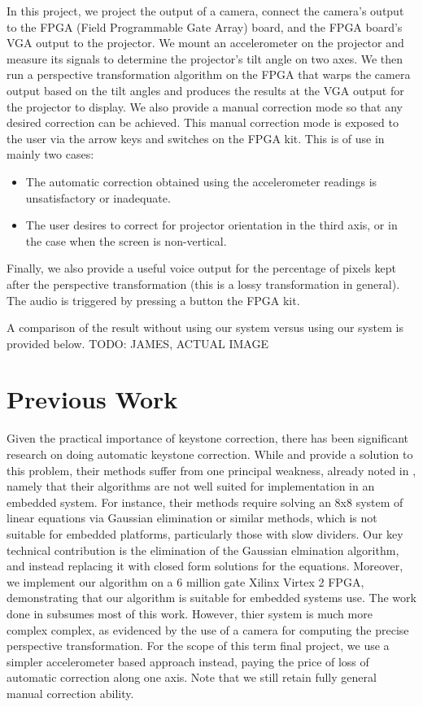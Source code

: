 \documentclass{article}
\begin{document}
In this project, we project the output of a camera, connect the camera's output to the FPGA (Field Programmable Gate Array) board,
and the FPGA board's VGA output to the projector.
We mount an accelerometer on the projector and measure its signals to determine the projector's tilt angle on two axes.
We then run a perspective transformation algorithm on the FPGA that warps the camera output based on the tilt angles and produces the results at the VGA output for the projector to display.
We also provide a manual correction mode so that any desired correction can be achieved.
This manual correction mode is exposed to the user via the arrow keys and switches on the FPGA kit.
This is of use in mainly two cases:
\begin{itemize}
\item The automatic correction obtained using the accelerometer readings is unsatisfactory or inadequate.
\item The user desires to correct for projector orientation in the third axis, or in the case when the screen is non-vertical.
\end{itemize}
Finally, we also provide a useful voice output for the percentage of pixels kept after the perspective transformation (this is a lossy transformation in general).
The audio is triggered by pressing a button the FPGA kit.

A comparison of the result without using our system versus using our system is provided below.
TODO: JAMES, ACTUAL IMAGE

\section{Previous Work}
Given the practical importance of keystone correction, there has been significant research on doing automatic keystone correction.
While \citet{raskar2001self} and \citet{sukthankar2001smarter} provide a solution to this problem, their methods suffer from one principal weakness,
already noted in \citet{baoxin2004automatic}, namely that their algorithms are not well suited for implementation in an embedded system.
For instance, their methods require solving an 8x8 system of linear equations via Gaussian elimination or similar methods,
which is not suitable for embedded platforms, particularly those with slow dividers.
Our key technical contribution is the elimination of the Gaussian elmination algorithm,
and instead replacing it with closed form solutions for the equations.
Moreover, we implement our algorithm on a 6 million gate Xilinx Virtex 2 FPGA, demonstrating that our algorithm is suitable for embedded systems use.
The work done in \citet{baoxin2004automatic} subsumes most of this work.
However, thier system is much more complex complex, as evidenced by the use of a camera for computing the precise perspective transformation.
For the scope of this term final project,
we use a simpler accelerometer based approach instead, paying the price of loss of automatic correction along one axis.
Note that we still retain fully general manual correction ability.
\end{document}
